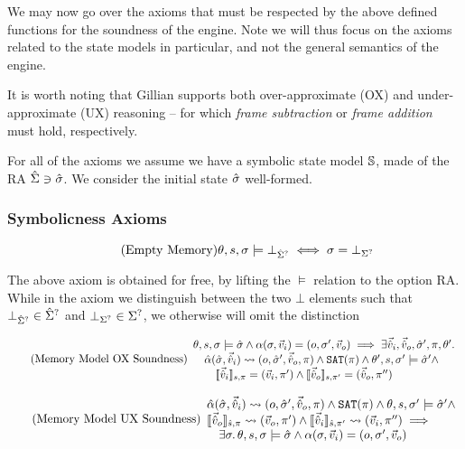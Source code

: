 We may now go over the axioms that must be respected by the above defined functions for the soundness of the engine. Note we will thus focus on the axioms related to the state models in particular, and not the general semantics of the engine.

It is worth noting that Gillian supports both over-approximate (OX) and under-approximate (UX) reasoning -- for which \emph{frame subtraction} or \emph{frame addition} must hold, respectively.

For all of the axioms we assume we have a symbolic state model $\mmdl$, made of the RA $\Sst \ni \sst$. We consider the initial state $\sst$ well-formed.

\subsubsection{Symbolicness Axioms }

\begin{equation}
\tag{Empty Memory}\label{eq:empty-mem}
\theta,s,\st\models \bot_{\Sst^?} \iff \st = \bot_{\St^?}
\end{equation}

The above axiom is obtained for free, by lifting the $\models$ relation to the option RA. While in the axiom we distinguish between the two $\bot$ elements such that $\bot_{\Sst^?}\in\Sst^?$ and $\bot_{\St^?}\in\St^?$, we otherwise will omit the distinction 

\begin{equation}
\tag{Memory Model OX Soundness}\label{eq:mem-ox-soundness}
\begin{array}{l}
\theta,s,\st\models\sst \land \ppexecc{\alpha}{\st,\ins}{o,\st',\outs} \implies \exists \sins,\souts,\sst',\pc,\theta'\ldotp\\
\quad \ppexec{\sym\alpha}{\sst,\sins}{o,\sst',\souts,\pc} \land \SAT(\pc) \land \theta',s,\st'\models \sst' \land\\
\qquad \expeval[s,\pc]{\sins}=(\ins,\pc')\land\expeval[s,\pc']{\souts}=(\souts,\pc'')
\end{array}
\end{equation}

\begin{equation}
\tag{Memory Model UX Soundness}\label{eq:mem-ux-soundness}
\begin{array}{l}
\ppexec{\sym\alpha}{\sst,\sins}{o,\sst',\souts,\pc} \land \SAT(\pc) \land \theta,s,\st'\models\sst' \land \\
\expeval[\sym s,\pc]{\souts}\rightsquigarrow(\outs,\pc')\land \expeval[\sym s,\pc']{\sins}\rightsquigarrow(\ins,\pc'')\implies\\
\quad \exists \st\ldotp \theta,s,\st\models\sst \land \ppexecc{\alpha}{\st,\ins}{o,\st',\outs}
\end{array}
\end{equation}

